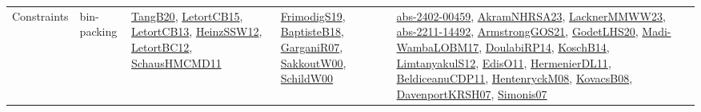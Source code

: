 {\begin{longtable}{lp{3cm}>{\raggedright}p{6cm}>{\raggedright}p{6cm}p{8cm}}
Constraints & bin-packing & \href{papers/TangB20.pdf}{TangB20}\cite{TangB20}, \href{articles/LetortCB15.pdf}{LetortCB15}\cite{LetortCB15}, \href{papers/LetortCB13.pdf}{LetortCB13}\cite{LetortCB13}, \href{articles/HeinzSSW12.pdf}{HeinzSSW12}\cite{HeinzSSW12}, \href{papers/LetortBC12.pdf}{LetortBC12}\cite{LetortBC12}, \href{articles/SchausHMCMD11.pdf}{SchausHMCMD11}\cite{SchausHMCMD11} & \href{papers/FrimodigS19.pdf}{FrimodigS19}\cite{FrimodigS19}, \href{articles/BaptisteB18.pdf}{BaptisteB18}\cite{BaptisteB18}, \href{papers/GarganiR07.pdf}{GarganiR07}\cite{GarganiR07}, \href{articles/SakkoutW00.pdf}{SakkoutW00}\cite{SakkoutW00}, \href{articles/SchildW00.pdf}{SchildW00}\cite{SchildW00} & \href{articles/abs-2402-00459.pdf}{abs-2402-00459}\cite{abs-2402-00459}, \href{articles/AkramNHRSA23.pdf}{AkramNHRSA23}\cite{AkramNHRSA23}, \href{articles/LacknerMMWW23.pdf}{LacknerMMWW23}\cite{LacknerMMWW23}, \href{articles/abs-2211-14492.pdf}{abs-2211-14492}\cite{abs-2211-14492}, \href{papers/ArmstrongGOS21.pdf}{ArmstrongGOS21}\cite{ArmstrongGOS21}, \href{papers/GodetLHS20.pdf}{GodetLHS20}\cite{GodetLHS20}, \href{papers/Madi-WambaLOBM17.pdf}{Madi-WambaLOBM17}\cite{Madi-WambaLOBM17}, \href{papers/DoulabiRP14.pdf}{DoulabiRP14}\cite{DoulabiRP14}, \href{papers/KoschB14.pdf}{KoschB14}\cite{KoschB14}, \href{articles/LimtanyakulS12.pdf}{LimtanyakulS12}\cite{LimtanyakulS12}, \href{papers/EdisO11.pdf}{EdisO11}\cite{EdisO11}, \href{papers/HermenierDL11.pdf}{HermenierDL11}\cite{HermenierDL11}, \href{articles/BeldiceanuCDP11.pdf}{BeldiceanuCDP11}\cite{BeldiceanuCDP11}, \href{papers/HentenryckM08.pdf}{HentenryckM08}\cite{HentenryckM08}, \href{articles/KovacsB08.pdf}{KovacsB08}\cite{KovacsB08}, \href{papers/DavenportKRSH07.pdf}{DavenportKRSH07}\cite{DavenportKRSH07}, \href{articles/Simonis07.pdf}{Simonis07}\cite{Simonis07}\\

\end{longtable}}
